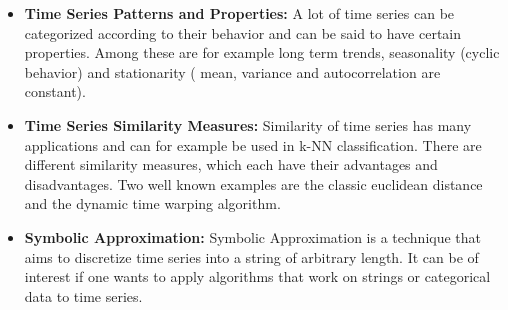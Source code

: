 \begin{itemize}
	\item \textbf{Time Series Patterns and Properties:} A lot of time series can be categorized according to their behavior and can be said to have certain properties. Among these are for example long term trends, seasonality (cyclic behavior) and stationarity ( mean, variance and autocorrelation are constant).
	\item \textbf{Time Series Similarity Measures:} Similarity of time series has many applications and can for example be used in k-NN classification. There are different similarity measures, which each have their advantages and disadvantages. Two well known examples are the classic euclidean distance and the dynamic time warping algorithm.
	\item \textbf{Symbolic Approximation:} Symbolic Approximation is a technique that aims to discretize time series into a string of arbitrary length. It can be of interest if one wants to apply algorithms that work on strings or categorical data to time series.
\end{itemize}

